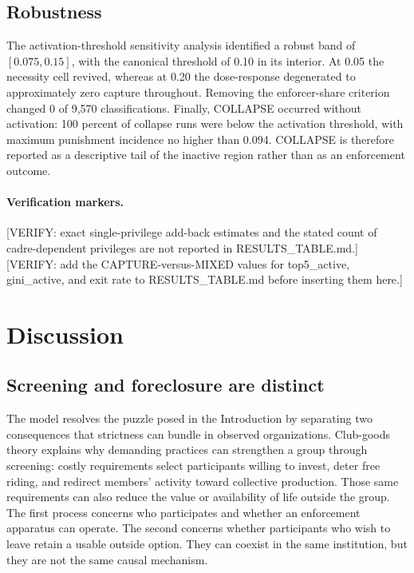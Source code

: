 \documentclass[12pt]{article}
\begin{document}
\subsection{Robustness}

The activation-threshold sensitivity analysis identified a robust band of $[0.075,0.15]$, with the canonical threshold of 0.10 in its interior. At 0.05 the necessity cell revived, whereas at 0.20 the dose-response degenerated to approximately zero capture throughout. Removing the enforcer-share criterion changed 0 of 9,570 classifications. Finally, COLLAPSE occurred without activation: 100 percent of collapse runs were below the activation threshold, with maximum punishment incidence no higher than 0.094. COLLAPSE is therefore reported as a descriptive tail of the inactive region rather than as an enforcement outcome.

\paragraph{Verification markers.}
[VERIFY: exact single-privilege add-back estimates and the stated count of cadre-dependent privileges are not reported in RESULTS_TABLE.md.]
[VERIFY: add the CAPTURE-versus-MIXED values for top5_active, gini_active, and exit rate to RESULTS_TABLE.md before inserting them here.]

\section{Discussion}

\subsection{Screening and foreclosure are distinct}

The model resolves the puzzle posed in the Introduction by separating two consequences that strictness can bundle in observed organizations. Club-goods theory explains why demanding practices can strengthen a group through screening: costly requirements select participants willing to invest, deter free riding, and redirect members' activity toward collective production. Those same requirements can also reduce the value or availability of life outside the group. The first process concerns who participates and whether an enforcement apparatus can operate. The second concerns whether participants who wish to leave retain a usable outside option. They can coexist in the same institution, but they are not the same causal mechanism.
\end{document}
